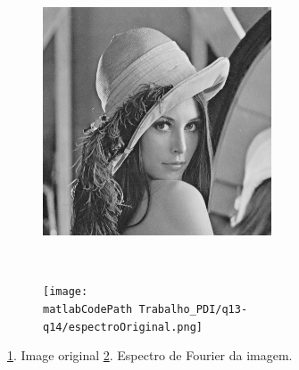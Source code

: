 \documentclass[
	article,			%
	11pt,				%
	oneside,			%
	a4paper,			%
	english,			%
	brazil,				%
	sumario=tradicional
	]{abntex2}
\newcommand{\matlabCodePath}{/home/clifte/git/Mestrado/Matlab/}
\begin{document}
\begin{figure}
		\centering
        \begin{subfigure}[b]{0.3\textwidth}
                \includegraphics[width=\textwidth,scale=1]{imagens/ex2/lena.png}
                \caption{}
                \label{fig:lenaOriginal}
        \end{subfigure}%
        ~ %
        \begin{subfigure}[b]{0.3\textwidth}
                \texttt{[image: \\matlabCodePath Trabalho\_PDI/q13-q14/espectroOriginal.png]}
                \caption{}
                \label{fig:especOriginal}
        \end{subfigure}
       
        \caption{ 
        \ref{fig:lenaOriginal}. Image original
        \ref{fig:especOriginal}. Espectro de Fourier da imagem.
        }
		\label{fig:lenaOriginalEspectro}
\end{figure}
\end{document}
